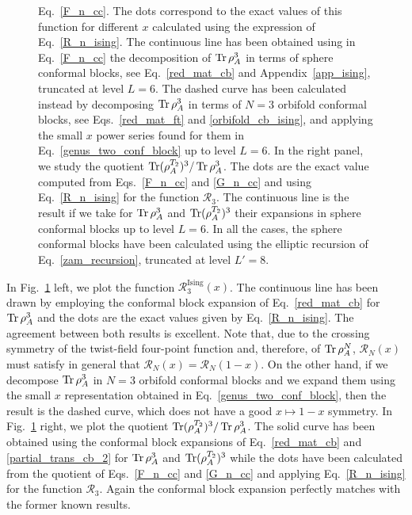 \documentclass[a4paper,11pt]{article}
\def\Tr{\mathop{\mbox{\normalfont Tr}}\nolimits}
\begin{document}
\begin{figure}[t]
{Eq.~\eqref{F_n_cc}. The dots correspond to the exact values of this function for different $x$ 
calculated using the expression of Eq.~\eqref{R_n_ising}. The continuous 
line has been obtained using in Eq.~\eqref{F_n_cc} the decomposition of $\Tr\rho_A^3$ in terms
of sphere conformal blocks, see Eq.~\eqref{red_mat_cb} and Appendix~\ref{app_ising}, truncated
at level $L=6$. The dashed curve has been calculated instead by decomposing $\Tr\rho_A^3$ in terms 
of $N=3$ orbifold conformal blocks, see Eqs.~\eqref{red_mat_ft} and \eqref{orbifold_cb_ising}, and applying the small $x$ power 
series found for them in Eq.~\eqref{genus_two_conf_block} up to level $L=6$. In the right panel, we study the quotient
$\Tr(\rho_A^{T_2})^3/\Tr\rho_A^3$. The dots are the exact value computed from Eqs.~\eqref{F_n_cc} and 
\eqref{G_n_cc} and using Eq.~\eqref{R_n_ising} for the function $\mathcal{R}_3$. The continuous 
line is the result if we take for $\Tr\rho_A^3$ and $\Tr(\rho_A^{T_2})^3$ their expansions in 
sphere conformal blocks up to level $L=6$. In all the cases, the sphere conformal blocks have been
calculated using the elliptic recursion of Eq.~\eqref{zam_recursion}, truncated at level $L'=8$.}\label{fig:ent_ising}
\end{figure}


In Fig.~\ref{fig:ent_ising} left, we plot the function $\mathcal{R}_3^{\text{Ising}}(x)$. 
The continuous line has been drawn by employing the conformal block expansion of Eq.~\eqref{red_mat_cb} 
for $\Tr\rho_A^3$ and the dots are the exact values given by Eq.~\eqref{R_n_ising}. 
The agreement between both results is excellent. Note that, due to the crossing symmetry of the 
twist-field four-point function and, therefore, of $\Tr\rho_A^N$, $\mathcal{R}_N(x)$ must 
satisfy in general that $\mathcal{R}_N(x)=\mathcal{R}_N(1-x)$. On the other hand, if we 
decompose $\Tr\rho_A^3$ in $N=3$ orbifold conformal blocks and we expand them using the 
small $x$ representation obtained in Eq.~\eqref{genus_two_conf_block}, then the result is the dashed curve, which 
does not have a good $x\mapsto 1-x$ symmetry. In Fig.~\ref{fig:ent_ising} right, we plot the quotient $\Tr(\rho_A^{T_2})^3/\Tr\rho_A^3$. 
The solid curve has been obtained using the conformal block expansions of Eq.~\eqref{red_mat_cb} 
and \eqref{partial_trans_cb_2} for $\Tr\rho_A^3$ and $\Tr(\rho_A^{T_2})^3$ while 
the dots have been calculated from the quotient of Eqs.~\eqref{F_n_cc} and \eqref{G_n_cc} 
and applying Eq.~\eqref{R_n_ising} for the function $\mathcal{R}_3$. Again the conformal block
expansion perfectly matches with the former known results.
\end{document}
